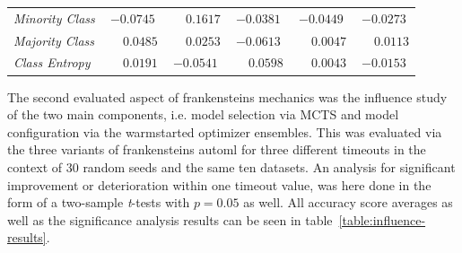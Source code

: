 \begin{table}[ht]
\begin{subtable}{\textwidth}
\begin{tabular}{l|ccccc}
            \textit{Minority Class} & $-0.0745$ & $\phantom{-}0.1617$ & $-0.0381$ & $-0.0449$ & $-0.0273$ \\
            \textit{Majority Class} & $\phantom{-}0.0485$ & $\phantom{-}0.0253$ & $-0.0613$ & $\phantom{-}0.0047$ & $\phantom{-}0.0113$ \\
            \textit{Class Entropy} & $\phantom{-}0.0191$ & $-0.0541$ & $\phantom{-}0.0598$ & $\phantom{-}0.0043$ & $-0.0153$ \\
            \hline
        \end{tabular}
    \end{subtable}
\end{table}

The second evaluated aspect of frankensteins mechanics was the influence study of the two main components, i.e. model selection via MCTS and model configuration via the warmstarted optimizer ensembles.\newline
This was evaluated via the three variants of frankensteins automl for three different timeouts in the context of 30 random seeds and the same ten datasets.
An analysis for significant improvement or deterioration within one timeout value, was here done in the form of a two-sample \textit{t}-tests with $p = 0.05$ as well.\newline
All accuracy score averages as well as the significance analysis results can be seen in table~\ref{table:influence-results}.

